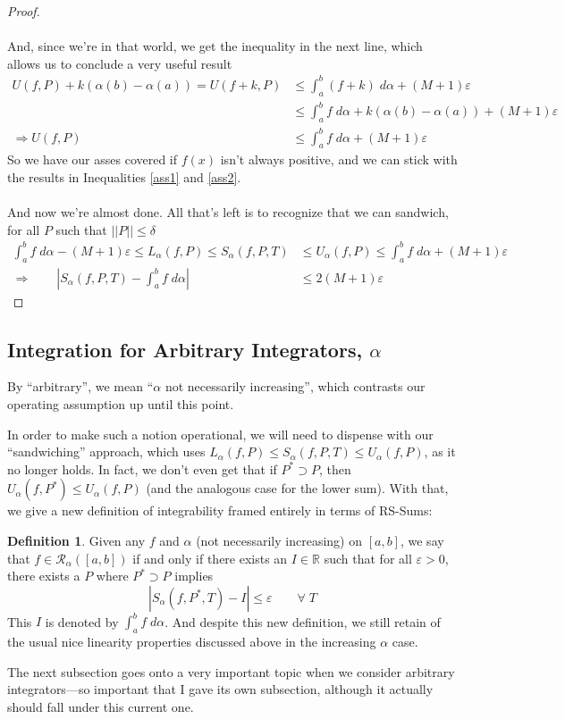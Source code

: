 \documentclass[12pt]{article}
\theoremstyle{plain}
\theoremstyle{definition}
\newtheorem{defn}[thm]{Definition}
\theoremstyle{remark}
\begin{document}
\begin{proof}
\\
\\
And, since we're in that world, we get the inequality in the next line, which allows us to conclude a very useful result
\begin{align*}
    U(f,P) + k(\alpha(b)-\alpha(a))  
        = U(f+k, P) &\leq \int^b_a (f+k)\; d\alpha 
        + (M+1)\varepsilon \\
    &\leq \int^b_a f\; d\alpha  + k(\alpha(b)-\alpha(a))
        + (M+1)\varepsilon \\
    \Rightarrow U(f,P) &\leq \int^b_a f\; d\alpha
        + (M+1)\varepsilon 
\end{align*}
So we have our asses covered if $f(x)$ isn't always positive, and we can stick with the results in Inequalities \ref{ass1} and \ref{ass2}.
\\
\\
And now we're almost done.  All that's left is to recognize that we can sandwich, for all $P$ such that $||P||\leq\delta$
\begin{align*}
    \int^b_a f\;d\alpha - (M+1)\varepsilon \leq
    L_\alpha(f,P) \leq S_\alpha(f,P,T) &\leq U_\alpha(f,P) \leq
   \int^b_a f\;d\alpha + (M+1)\varepsilon  \\
        \Rightarrow \qquad \left\lvert S_\alpha(f,P,T) 
        - \int^b_a f\;d\alpha\right\rvert &\leq 2(M+1)\varepsilon \end{align*}
\end{proof}

\newpage
\subsection{Integration for Arbitrary Integrators, $\alpha$}

By ``arbitrary'', we mean ``$\alpha$ not necessarily increasing'', which contrasts our operating assumption up until this point. 

In order to make such a notion operational, we will need to dispense with our ``sandwiching'' approach, which uses $L_\alpha(f,P)\leq S_\alpha(f,P,T)\leq U_\alpha(f,P)$, as it no longer holds. In fact, we don't even get that if $P^*\supset P$, then $U_\alpha(f,P^*) \leq U_\alpha(f,P)$ (and the analogous case for the lower sum). With that, we give a new definition of integrability framed entirely in terms of RS-Sums:

\begin{defn}
Given any $f$ and $\alpha$ (not necessarily increasing) on $[a,b]$, we say that $f\in\mathscr{R}_\alpha([a,b])$ if and only if there exists an $I\in\mathbb{R}$ such that for all $\varepsilon>0$, there exists a $P$ where $P^*\supset P$ implies
    \[ \left\lvert S_\alpha(f,P^*,T) - I \right\rvert \leq
        \varepsilon \qquad \forall \; T \]
This $I$ is denoted by $\int^b_a f\;d\alpha$. And despite this new definition, we still retain of the usual nice linearity properties discussed above in the increasing $\alpha$ case.
\end{defn}
The next subsection goes onto a very important topic when we consider arbitrary integrators---so important that I gave its own subsection, although it actually should fall under this current one.
\end{document}
